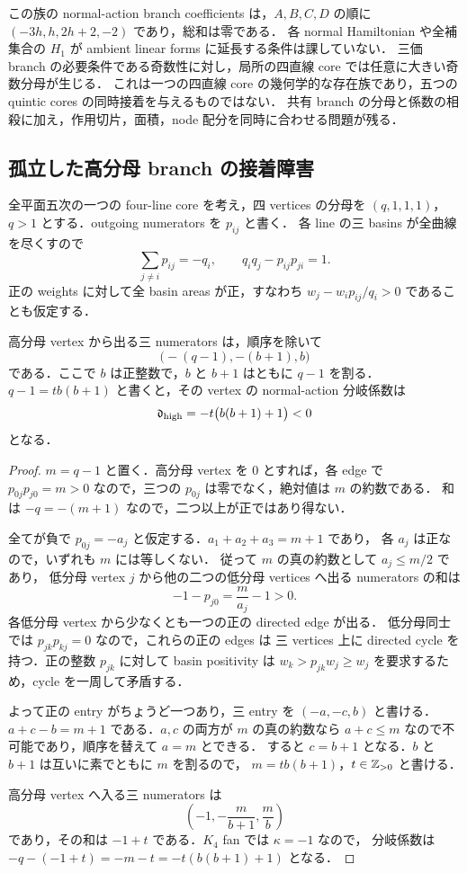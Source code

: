 この族の normal-action branch coefficients は，$A,B,C,D$ の順に
$(-3h,h,2h+2,-2)$ であり，総和は零である．
各 normal Hamiltonian や全補集合の $H_1$ が ambient linear forms に延長する条件は課していない．
三価 branch の必要条件である奇数性に対し，局所の四直線 core では任意に大きい奇数分母が生じる．
これは一つの四直線 core の幾何学的な存在族であり，五つの quintic cores の同時接着を与えるものではない．
共有 branch の分母と係数の相殺に加え，作用切片，面積，node 配分を同時に合わせる問題が残る．

\subsection{孤立した高分母 branch の接着障害}
\label{qh9:isolated-section}

全平面五次の一つの four-line core を考え，四 vertices の分母を
$(q,1,1,1)$，$q>1$ とする．outgoing numerators を $p_{ij}$ と書く．
各 line の三 basins が全曲線を尽くすので
\[
 \sum_{j\ne i}p_{ij}=-q_i,
 \qquad q_iq_j-p_{ij}p_{ji}=1.
\]
正の weights に対して全 basin areas が正，すなわち
$w_j-w_i p_{ij}/q_i>0$ であることも仮定する．

\begin{proposition}\label{qh9:isolated-local}
高分母 vertex から出る三 numerators は，順序を除いて
\[
 \bigl(-(q-1),-(b+1),b\bigr)
\]
である．ここで $b$ は正整数で，$b$ と $b+1$ はともに $q-1$ を割る．
$q-1=t b(b+1)$ と書くと，その vertex の normal-action 分岐係数は
\[
 \mathfrak d_{\rm high}=-t\bigl(b(b+1)+1\bigr)<0
\]
となる．
\end{proposition}

\begin{proof}
$m=q-1$ と置く．高分母 vertex を $0$ とすれば，各 edge で
$p_{0j}p_{j0}=m>0$ なので，三つの $p_{0j}$ は零でなく，絶対値は $m$ の約数である．
和は $-q=-(m+1)$ なので，二つ以上が正ではあり得ない．

全てが負で $p_{0j}=-a_j$ と仮定する．$a_1+a_2+a_3=m+1$ であり，
各 $a_j$ は正なので，いずれも $m$ には等しくない．
従って $m$ の真の約数として $a_j\le m/2$ であり，
低分母 vertex $j$ から他の二つの低分母 vertices へ出る numerators の和は
\[
 -1-p_{j0}=\frac{m}{a_j}-1>0.
\]
各低分母 vertex から少なくとも一つの正の directed edge が出る．
低分母同士では $p_{jk}p_{kj}=0$ なので，これらの正の edges は
三 vertices 上に directed cycle を持つ．正の整数 $p_{jk}$ に対して basin positivity は
$w_k>p_{jk}w_j\ge w_j$ を要求するため，cycle を一周して矛盾する．

よって正の entry がちょうど一つあり，三 entry を $(-a,-c,b)$ と書ける．
$a+c-b=m+1$ である．$a,c$ の両方が $m$ の真の約数なら
$a+c\le m$ なので不可能であり，順序を替えて $a=m$ とできる．
すると $c=b+1$ となる．$b$ と $b+1$ は互いに素でともに $m$ を割るので，
$m=t b(b+1)$，$t\in\mathbb Z_{>0}$ と書ける．

高分母 vertex へ入る三 numerators は
\[
 \left(-1,-\frac{m}{b+1},\frac{m}{b}\right)
\]
であり，その和は $-1+t$ である．$K_4$ fan では $\kappa=-1$ なので，
分岐係数は $-q-(-1+t)=-m-t=-t(b(b+1)+1)$ となる．
\end{proof}

